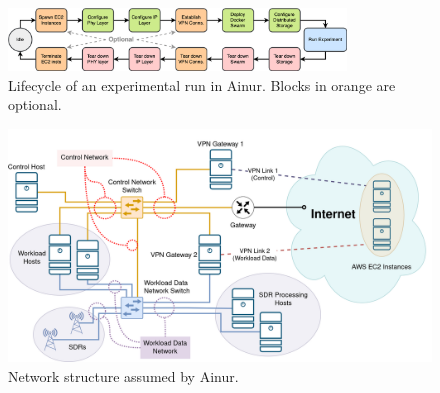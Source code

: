 \begin{figure}
    \centering
    \includegraphics[width=0.8\textwidth]{publications/2022Ainur/figures/flow2.png}
    \caption{Lifecycle of an experimental run in Ainur. Blocks in orange are optional.}\label{fig:flow}
\end{figure}

\begin{figure}
    \centering
    \includegraphics[width=.8\textwidth]{publications/2022Ainur/figures/network.png}
    \caption{Network structure assumed by Ainur.}\label{fig:network}
\end{figure}
